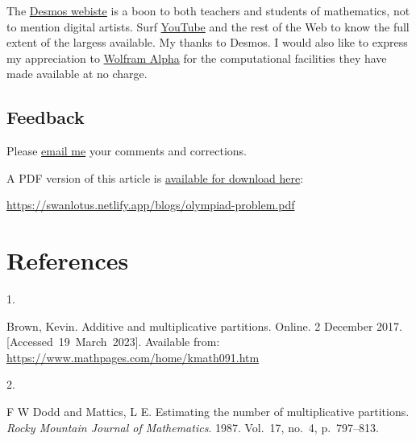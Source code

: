 \documentclass[
  a4paper,
]{article}
\newlength{\cslhangindent}
\newlength{\csllabelwidth}
\newlength{\cslentryspacingunit} %
\newenvironment{CSLReferences}[2] %
 {%
  \setlength{\parindent}{0pt}
  \ifodd #1
  \let\oldpar\par
  \def\par{\hangindent=\cslhangindent\oldpar}
  \fi
  \setlength{\parskip}{#2\cslentryspacingunit}
 }%
 {}
\newcommand{\CSLLeftMargin}[1]{\parbox[t]{\csllabelwidth}{#1}}
\newcommand{\CSLRightInline}[1]{\parbox[t]{\linewidth - \csllabelwidth}{#1}\break}
\begin{document}
The \href{https://www.desmos.com/}{Desmos webiste} is a boon to both
teachers and students of mathematics, not to mention digital artists.
Surf \href{desmos}{YouTube} and the rest of the Web to know the full
extent of the largess available. My thanks to Desmos. I would also like
to express my appreciation to
\href{https://www.wolframalpha.com/}{Wolfram Alpha} for the
computational facilities they have made available at no charge.

\hypertarget{feedback}{%
\subsection{Feedback}\label{feedback}}

Please \href{mailto:feedback.swanlotus@gmail.com}{email me} your
comments and corrections.

\noindent A PDF version of this article is
\href{./olympiad-problem.pdf}{available for download here}:

\begin{small}

\begin{sffamily}

\url{https://swanlotus.netlify.app/blogs/olympiad-problem.pdf}

\end{sffamily}

\end{small}

\hypertarget{bibliography}{%
\section*{References}\label{bibliography}}

\hypertarget{refs}{}
\begin{CSLReferences}{0}{0}
\leavevmode{}%
\CSLLeftMargin{1. }%
\CSLRightInline{Brown, Kevin. Additive and multiplicative partitions.
Online. 2 December 2017. {[}Accessed~19~March~2023{]}. Available from:
\url{https://www.mathpages.com/home/kmath091.htm}}

\leavevmode{}%
\CSLLeftMargin{2. }%
\CSLRightInline{F W Dodd and Mattics, L E. Estimating the number of
multiplicative partitions. \emph{Rocky Mountain Journal of Mathematics}.
1987. Vol.~17, no.~4, p.~797--813. }

\end{CSLReferences}
\end{document}
